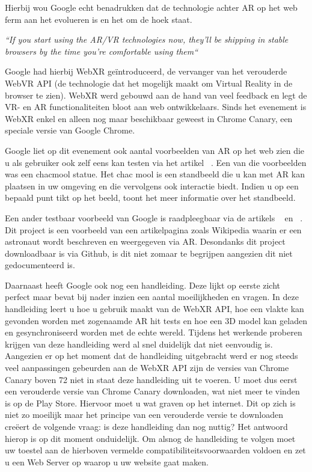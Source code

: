Hierbij wou Google echt benadrukken dat de technologie achter AR op het web ferm aan het evolueren is en het om de hoek staat. 
 
\textit{``If you start using the AR/VR technologies now, they’ll be shipping in stable browsers by the time you’re comfortable using them``}

Google had hierbij WebXR geïntroduceerd, de vervanger van het verouderde WebVR API (de technologie dat het mogelijk maakt om Virtual Reality in de browser te zien). WebXR werd gebouwd aan de hand van veel feedback en legt de VR- en AR functionaliteiten bloot aan web ontwikkelaars. Sinds het evenement is WebXR enkel en alleen nog maar beschikbaar geweest in Chrome Canary, een speciale versie van Google Chrome.
 
Google liet op dit evenement ook aantal voorbeelden van AR op het web zien die u als gebruiker ook zelf eens kan testen via het artikel ~\textcite{Medley2018}. Een van die voorbeelden was een chacmool statue. Het chac mool is een standbeeld die u kan met AR kan plaatsen in uw omgeving en die vervolgens ook interactie biedt. Indien u op een bepaald punt tikt op het beeld, toont het meer informatie over het standbeeld. 

Een ander testbaar voorbeeld van Google is raadpleegbaar via de artikels ~\textcite{Stanush2018} en ~\textcite{Ali2018}. 
Dit project is een voorbeeld van een artikelpagina zoals Wikipedia waarin er een astronaut wordt beschreven en weergegeven via AR. Desondanks dit project downloadbaar is via Github, is dit niet zomaar te begrijpen aangezien dit niet gedocumenteerd is. 
 
 Daarnaast heeft Google ook nog een handleiding. Deze lijkt op eerste zicht perfect maar bevat bij nader inzien een aantal moeilijkheden en vragen. 
 In deze handleiding leert u hoe u gebruik maakt van de WebXR API, hoe een vlakte kan gevonden worden met zogenaamde AR hit tests en hoe een 3D model kan geladen en gesynchroniseerd worden met de echte wereld. Tijdens het werkende proberen krijgen van deze handleiding werd al snel duidelijk dat niet eenvoudig is. Aangezien er op het moment dat de handleiding uitgebracht werd er nog steeds veel aanpassingen gebeurden aan de WebXR API zijn de versies van Chrome Canary boven 72 niet in staat deze handleiding uit te voeren. U moet dus eerst een verouderde versie van Chrome Canary downloaden, wat niet meer te vinden is op de Play Store. Hiervoor moet u wat graven op het internet. Dit op zich is niet zo moeilijk maar het principe van een verouderde versie te downloaden creëert de volgende vraag: is deze handleiding dan nog nuttig? Het antwoord hierop is op dit moment onduidelijk. Om alsnog de handleiding te volgen moet uw toestel aan de hierboven vermelde compatibiliteitsvoorwaarden voldoen en zet u een Web Server op waarop u uw website gaat maken. 


